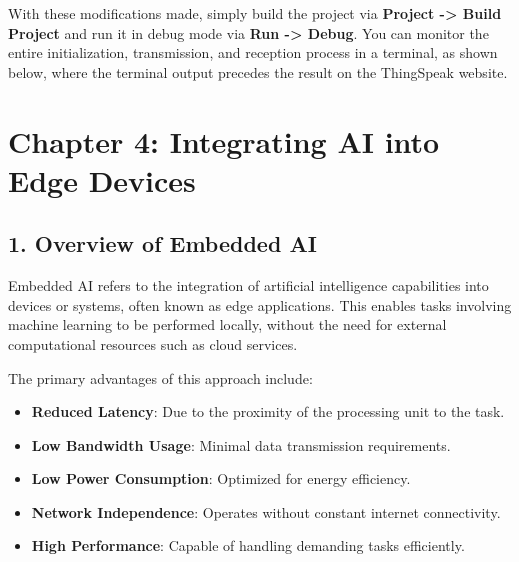\documentclass[10pt,a4paper,onecolumn]{article}
\providecommand{\tightlist}{%
  \setlength{\itemsep}{0pt}\setlength{\parskip}{0pt}}
\begin{document}
With these modifications made, simply build the project via
\textbf{Project -\textgreater{} Build Project} and run it in debug mode
via \textbf{Run -\textgreater{} Debug}. You can monitor the entire
initialization, transmission, and reception process in a terminal, as
shown below, where the terminal output precedes the result on the
ThingSpeak website.

\begin{figure}[H]
  \centering
\end{figure}

\hypertarget{chapter-4-integrating-ai-into-edge-devices}{%
\section{Chapter 4: Integrating AI into Edge
Devices}\label{chapter-4-integrating-ai-into-edge-devices}}

\hypertarget{overview-of-embedded-ai}{%
\subsection{1. Overview of Embedded AI}\label{overview-of-embedded-ai}}

Embedded AI refers to the integration of artificial intelligence
capabilities into devices or systems, often known as edge applications.
This enables tasks involving machine learning to be performed locally,
without the need for external computational resources such as cloud
services.

The primary advantages of this approach include:

\begin{itemize}
\tightlist
\item
  \textbf{Reduced Latency}: Due to the proximity of the processing unit
  to the task.
\item
  \textbf{Low Bandwidth Usage}: Minimal data transmission requirements.
\item
  \textbf{Low Power Consumption}: Optimized for energy efficiency.
\item
  \textbf{Network Independence}: Operates without constant internet
  connectivity.
\item
  \textbf{High Performance}: Capable of handling demanding tasks
  efficiently.
\end{itemize}
\end{document}
